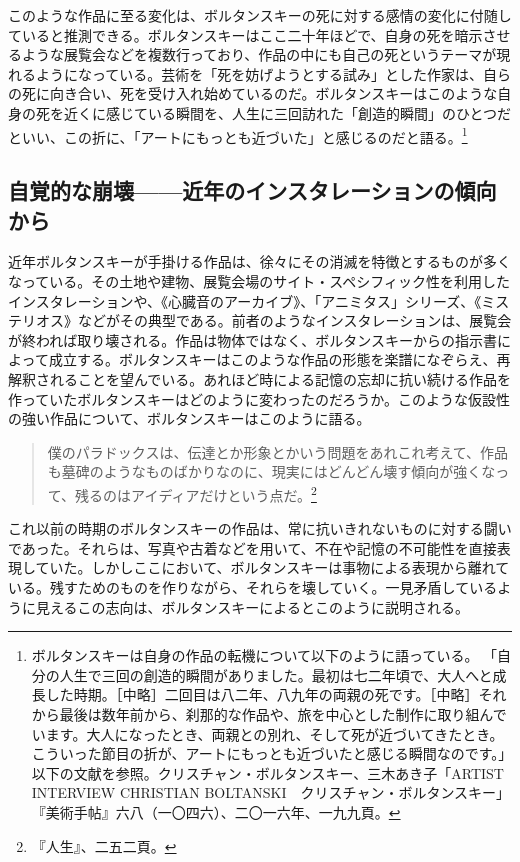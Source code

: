 \documentclass[b5j,twoside,twocolumn]{utarticle}
\begin{document}
このような作品に至る変化は、ボルタンスキーの死に対する感情の変化に付随していると推測できる。ボルタンスキーはここ二十年ほどで、自身の死を暗示させるような展覧会などを複数行っており、作品の中にも自己の死というテーマが現れるようになっている。芸術を「死を妨げようとする試み」とした作家は、自らの死に向き合い、死を受け入れ始めているのだ。ボルタンスキーはこのような自身の死を近くに感じている瞬間を、人生に三回訪れた「創造的瞬間」のひとつだといい、この折に、「アートにもっとも近づいた」と感じるのだと語る。\footnote{ボルタンスキーは自身の作品の転機について以下のように語っている。
「自分の人生で三回の創造的瞬間がありました。最初は七二年頃で、大人へと成長した時期。［中略］二回目は八二年、八九年の両親の死です。［中略］それから最後は数年前から、刹那的な作品や、旅を中心とした制作に取り組んでいます。大人になったとき、両親との別れ、そして死が近づいてきたとき。こういった節目の折が、アートにもっとも近づいたと感じる瞬間なのです。」以下の文献を参照。クリスチャン・ボルタンスキー、三木あき子「ARTIST INTERVIEW CHRISTIAN BOLTANSKI　クリスチャン・ボルタンスキー」『美術手帖』六八（一〇四六）、二〇一六年、一九九頁。}

\subsection{\tbaselineshift =3.0pt 自覚的な崩壊------近年のインスタレーションの傾向から}
近年ボルタンスキーが手掛ける作品は、徐々にその消滅を特徴とするものが多くなっている。その土地や建物、展覧会場のサイト・スペシフィック性を利用したインスタレーションや、《心臓音のアーカイブ》、「アニミタス」シリーズ、《ミステリオス》などがその典型である。前者のようなインスタレーションは、展覧会が終われば取り壊される。作品は物体ではなく、ボルタンスキーからの指示書によって成立する。ボルタンスキーはこのような作品の形態を楽譜になぞらえ、再解釈されることを望んでいる。あれほど時による記憶の忘却に抗い続ける作品を作っていたボルタンスキーはどのように変わったのだろうか。このような仮設性の強い作品について、ボルタンスキーはこのように語る。

\begin{quote}
僕のパラドックスは、伝達とか形象とかいう問題をあれこれ考えて、作品も墓碑のようなものばかりなのに、現実にはどんどん壊す傾向が強くなって、残るのはアイディアだけという点だ。\footnote{『人生』、二五二頁。}
\end{quote}


これ以前の時期のボルタンスキーの作品は、常に抗いきれないものに対する闘いであった。それらは、写真や古着などを用いて、不在や記憶の不可能性を直接表現していた。しかしここにおいて、ボルタンスキーは事物による表現から離れている。残すためのものを作りながら、それらを壊していく。一見矛盾しているように見えるこの志向は、ボルタンスキーによるとこのように説明される。
\end{document}
